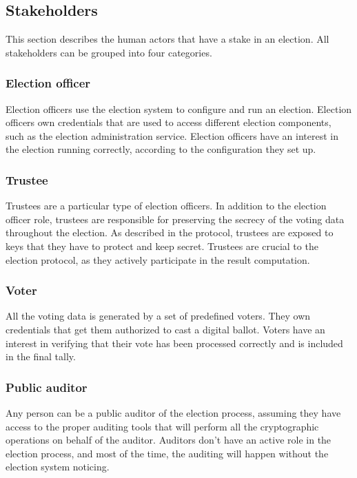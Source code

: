 \subsection{Stakeholders} \label{sec: stakeholders}

This section describes the human actors that have a stake in an election. All stakeholders can be grouped into four categories.

\subsubsection{Election officer}
Election officers use the election system to configure and run an election. Election officers own credentials that are used to access different election components, such as the election administration service. Election officers have an interest in the election running correctly, according to the configuration they set up.

\subsubsection{Trustee}
Trustees are a particular type of election officers. In addition to the election officer role, trustees are responsible for preserving the secrecy of the voting data throughout the election. As described in the protocol, trustees are exposed to keys that they have to protect and keep secret. Trustees are crucial to the election protocol, as they actively participate in the result computation.

\subsubsection{Voter}
All the voting data is generated by a set of predefined voters. They own credentials that get them authorized to cast a digital ballot. Voters have an interest in verifying that their vote has been processed correctly and is included in the final tally.

\subsubsection{Public auditor}
Any person can be a public auditor of the election process, assuming they have access to the proper auditing tools that will perform all the cryptographic operations on behalf of the auditor. Auditors don't have an active role in the election process, and most of the time, the auditing will happen without the election system noticing.
